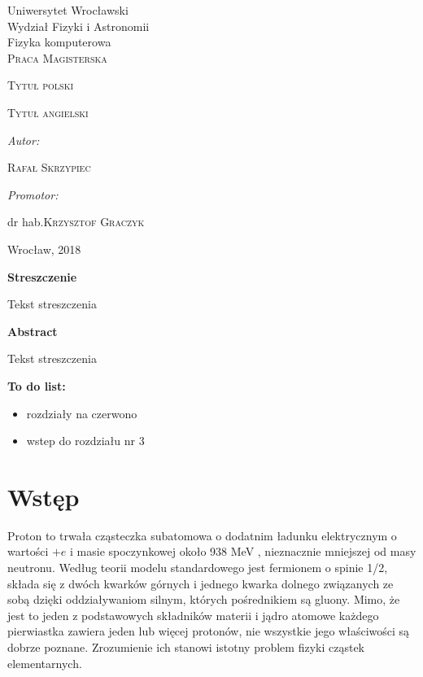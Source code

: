 \documentclass[11pt]{book}
\title{}
\author{Rafał Skrzypiec}
\makeatletter
\theoremstyle{definition}
\newcommand\blankpage{%
	\null
	\thispagestyle{empty}%
	\addtocounter{page}{0}%
	\newpage}
\renewcommand{\maketitle}{\begin{titlepage}
		
		
		
		\begin{center}
			{\Large Uniwersytet Wrocławski\\
				\vspace{0.cm}
				Wydział Fizyki i Astronomii\\
				\vspace{0.2cm}
				Fizyka komputerowa} \\
			\vspace{1.8cm}
			\LARGE \textsc{ Praca Magisterska}		
		\end{center}
		
		\vspace{3.5cm}
		
		\noindent
		
		\begin{center}		
			\huge \textsc{\@ Tytuł polski}
			
			\vspace{0.5cm}
			
			\normalsize \textsc {Tytuł angielski}
			
		\end{center}
		
		
		
		\vspace{3cm}
		
		\begin{flushright}
			
			\begin{minipage}{5.5cm}
				
				\textit{\small Autor:}
				
				\normalsize \textsc{\@ Rafał Skrzypiec} \par
				
			\end{minipage}
			
			\vspace{1cm}
			
			
			\begin{minipage}{5.5cm}
				
				\textit{\small Promotor:}
				
				\hspace{0.2cm}dr hab.\textsc{\@ Krzysztof Graczyk} \par
				
			\end{minipage}
			
		\end{flushright}
		
		
		\vspace*{\stretch{4}}
		
		\begin{center}
			
			Wrocław, 2018
			
		\end{center}
		
	\end{titlepage}%
	
}
\makeatother
\begin{document}

\maketitle
\blankpage


\begin{center}
	{\large 	\textbf{Streszczenie}}

\end{center}
\normalsize 
	Tekst streszczenia

\vspace{2cm}

\begin{center}
	{\large 	\textbf{Abstract}}
\end{center}
\normalsize
	Tekst streszczenia

\vspace{2cm}

\textbf{To do list:}
\begin{itemize}
	\item rozdziały na czerwono
	\item wstep do rozdziału nr 3

\end{itemize}


\tableofcontents
{}
\chapter{Wstęp}

Proton to trwała cząsteczka subatomowa o dodatnim ładunku elektrycznym o wartości $+e$ i masie spoczynkowej około 938 MeV \cite{2012RvMP...84.1527M}, nieznacznie mniejszej od masy neutronu. Według teorii modelu standardowego jest fermionem o spinie 1/2, składa się z dwóch kwarków górnych i jednego kwarka dolnego związanych ze sobą dzięki oddziaływaniom silnym, których pośrednikiem są gluony. Mimo, że jest to jeden z podstawowych składników materii i jądro atomowe każdego pierwiastka zawiera jeden lub więcej protonów, nie wszystkie jego właściwości są dobrze poznane. Zrozumienie ich stanowi istotny problem fizyki cząstek elementarnych.
\end{document}
